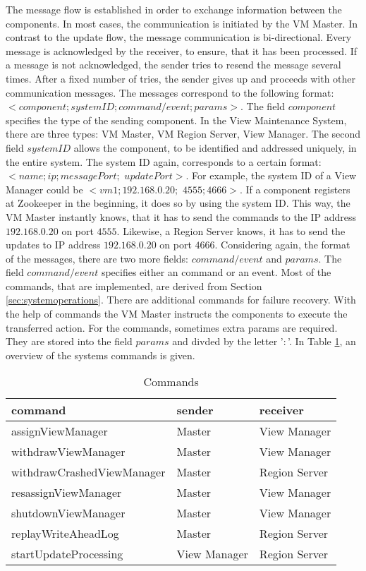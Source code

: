 \documentclass[11pt,a4paper,bibtotoc,idxtotoc,headsepline,footsepline,footexclude,BCOR12mm,DIV13]{scrbook}
\begin{document}
The message flow is established in order to exchange information between the components. In most cases, the communication is initiated by the VM Master. In contrast to the update flow, the message communication is bi-directional. Every message is acknowledged by the receiver, to ensure, that it has been processed. If a message is not acknowledged, the sender tries to resend the message several times. After a fixed number of tries, the sender gives up and proceeds with other communication messages.  The messages correspond to the following format: $<component;systemID;command/event;params>$. The field $component$ specifies the type of the sending component. In the View Maintenance System, there are three types:  VM Master, VM Region Server, View Manager. The second field $systemID$ allows the component, to be identified and addressed uniquely, in the entire system. The system ID again, corresponds to a certain format: $<name;ip;messagePort;$ $updatePort>$. For example, the system ID of a View Manager could be $<vm1;192.168.0.20;$ $4555;4666>$. If a component registers at Zookeeper in the beginning, it does so by using the system ID. This way, the VM Master instantly knows, that it has to send the commands to the IP address $192.168.0.20$ on port $4555$. Likewise, a Region Server knows, it has to send the updates to IP address  $192.168.0.20$ on port $4666$. Considering again, the format of the messages, there are two more fields: $command/event$ and $params$. The field $command/event$ specifies either an command or an event. Most of the commands, that are implemented, are derived from Section \ref{sec:systemoperations}. There are additional commands for failure recovery. With the help of commands the VM Master instructs the components to execute the transferred action. For the commands, sometimes extra params are required. They are stored into the field $params$ and divded by the letter '$:$'.  In Table \ref{tab:commands}, an overview of the systems commands is given.

\begin{table}[h!]
\begin{center}
\begin{tabular}{ l l l}
  command & sender & receiver \\  \hline
  assignViewManager & Master & View Manager \\
  withdrawViewManager & Master & View Manager \\
  withdrawCrashedViewManager & Master & Region Server \\
  resassignViewManager & Master & View Manager \\
  shutdownViewManager & Master & View Manager \\
  replayWriteAheadLog & Master & Region Server \\
  startUpdateProcessing & View Manager & Region Server \\
\end{tabular}
\end{center}
\caption{Commands}
\label{tab:commands}
\end{table}
\end{document}
